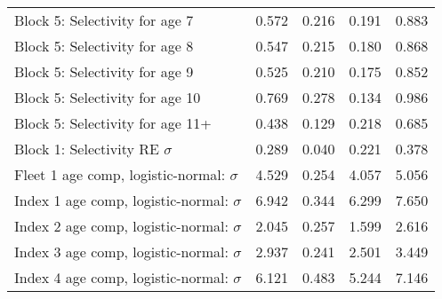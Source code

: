 \documentclass[
]{article}
\begin{document}
\begin{landscape}
\begin{longtable}[t]{lrrrr}
\addlinespace
Block 5: Selectivity for age 7 & 0.572 & 0.216 & 0.191 & 0.883\\
Block 5: Selectivity for age 8 & 0.547 & 0.215 & 0.180 & 0.868\\
Block 5: Selectivity for age 9 & 0.525 & 0.210 & 0.175 & 0.852\\
Block 5: Selectivity for age 10 & 0.769 & 0.278 & 0.134 & 0.986\\
Block 5: Selectivity for age 11+ & 0.438 & 0.129 & 0.218 & 0.685\\
\addlinespace
Block 1: Selectivity RE $\sigma$ & 0.289 & 0.040 & 0.221 & 0.378\\
Fleet 1 age comp, logistic-normal: $\sigma$ & 4.529 & 0.254 & 4.057 & 5.056\\
Index 1 age comp, logistic-normal: $\sigma$ & 6.942 & 0.344 & 6.299 & 7.650\\
Index 2 age comp, logistic-normal: $\sigma$ & 2.045 & 0.257 & 1.599 & 2.616\\
Index 3 age comp, logistic-normal: $\sigma$ & 2.937 & 0.241 & 2.501 & 3.449\\
\addlinespace
Index 4 age comp, logistic-normal: $\sigma$ & 6.121 & 0.483 & 5.244 & 7.146\\*
\end{longtable}
\end{landscape}
\end{document}
